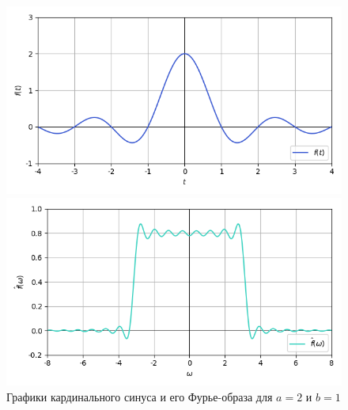 \documentclass[a4paper]{article}
\begin{document}
\begin{figure}[H]
    \begin{minipage}{0.5\textwidth}
        \centering \includegraphics[width=\textwidth]{sources/3_cardinal_sin/graph_2.png}
    \end{minipage}\hfill
    \begin{minipage}{0.5\textwidth}
        \centering \includegraphics[width=\textwidth]{sources/3_cardinal_sin/fourier_2.png}
    \end{minipage}
    \caption{Графики кардинального синуса и его Фурье-образа для $a = 2$ и $b = 1$} 
\end{figure}
\end{document}
